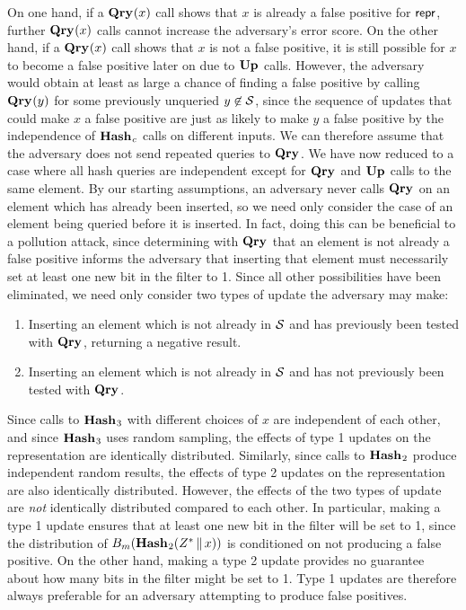 On one hand, if a $\textup{\textbf{Qry}}\hspace{0.5pt}(x)$ call shows that $x$ is already a false positive for
$\mathsf{repr}$, further $\textup{\textbf{Qry}}\hspace{0.5pt}(x)$ calls cannot increase the adversary's error score. On
the other hand, if a $\textup{\textbf{Qry}}\hspace{0.5pt}(x)$ call shows that $x$ is not a false positive, it
is still possible for $x$ to become a false positive later on due to $\textup{\textbf{Up}}\hspace{0.5pt}$
calls. However, the adversary would obtain at least as large a chance of finding
a false positive by calling $\textup{\textbf{Qry}}\hspace{0.5pt}(y)$ for some previously unqueried $y
\not\in\mathcal{S}$, since the sequence of updates that could make $x$ a false positive
are just as likely to make $y$ a false positive by the independence of
$\textup{\textbf{Hash}}\hspace{0.5pt}_c$ calls on different inputs. We can therefore assume that the adversary
does not send repeated queries to $\textup{\textbf{Qry}}\hspace{0.5pt}$.
%
We have now reduced to a case where all hash queries are independent except for
$\textup{\textbf{Qry}}\hspace{0.5pt}$ and $\textup{\textbf{Up}}\hspace{0.5pt}$ calls to the same element. By our starting assumptions, an
adversary never calls $\textup{\textbf{Qry}}\hspace{0.5pt}$ on an element which has already been inserted, so
we need only consider the case of an element being queried before it is
inserted. In fact, doing this can be beneficial to a pollution attack, since
determining with $\textup{\textbf{Qry}}\hspace{0.5pt}$ that an element is not already a false positive informs
the adversary that inserting that element must necessarily set at least one new
bit in the filter to 1. Since all other possibilities have been eliminated, we
need only consider two types of update the adversary may make:
%
\begin{enumerate}
  \item Inserting an element which is not already in $\mathcal{S}$ and has previously been tested with $\textup{\textbf{Qry}}\hspace{0.5pt}$, returning a negative result.
  \item Inserting an element which is not already in $\mathcal{S}$ and has not previously been tested with $\textup{\textbf{Qry}}\hspace{0.5pt}$.
\end{enumerate}
Since calls to $\textup{\textbf{Hash}}\hspace{0.5pt}_3$ with different choices of $x$ are independent of each
other, and since $\textup{\textbf{Hash}}\hspace{0.5pt}_3$ uses random sampling, the effects of type 1 updates
on the representation are identically distributed. Similarly, since calls to
$\textup{\textbf{Hash}}\hspace{0.5pt}_2$ produce independent random results, the effects of type 2 updates on
the representation are also identically distributed. However, the effects of the
two types of update are \emph{not} identically distributed compared to each
other. In particular, making a type 1 update ensures that at least one new bit
in the filter will be set to 1, since the distribution of
${B}_m(\textup{\textbf{Hash}}\hspace{0.5pt}_2(Z^* \, \| \, x))$ is conditioned on not producing a false
positive. On the other hand, making a type 2 update provides no guarantee about
how many bits in the filter might be set to 1. Type 1 updates are therefore
always preferable for an adversary attempting to produce false positives.

